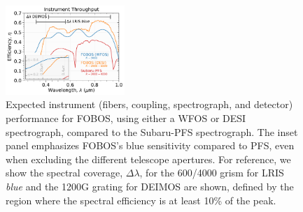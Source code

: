 \documentclass[11pt,letterpaper]{article}
\begin{document}

\begin{figure}\small
%
\includegraphics[width=0.4\textwidth]{./figs/throughput_comparison.pdf}
%
\caption{\label{fig:throughput} Expected instrument (fibers, coupling,
spectrograph, and detector) performance for FOBOS, using either a WFOS
or DESI spectrograph, compared to the Subaru-PFS spectrograph.
The inset panel emphasizes FOBOS's blue sensitivity compared to PFS,
even when excluding the different telescope apertures.  For reference,
we show the spectral coverage, $\Delta\lambda$, for the 600/4000 grism
for LRIS {\it blue} and the 1200G grating for DEIMOS are shown, defined
by the region where the spectral efficiency is at least 10\% of the
peak.
} \end{figure}
\end{document}
